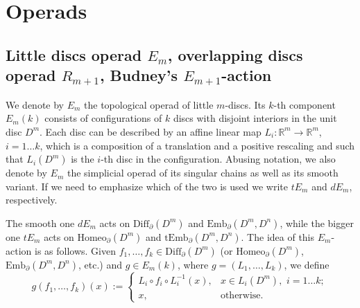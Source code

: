 \documentclass[11pt]{amsart}
\theoremstyle{definition}
\newcommand{\R}{{\mathbb R}}
\newcommand{\Emb}{\mathrm{Emb}}
\newcommand{\tEmb}{\mathrm{tEmb}}
\newcommand{\Diff}{\mathrm{Diff}}
\newcommand{\Homeo}{\mathrm{Homeo}}
\numberwithin{equation}{section}
\begin{document}
\section{Operads}\label{s:operads}

\subsection{Little discs operad $E_m$, overlapping discs operad $R_{m+1}$, Budney's $E_{m+1}$-action}\label{ss:little_discs}
We denote by $E_m$ the topological operad of little $m$-discs. Its $k$-th component $E_m(k)$ consists of configurations of $k$ discs with disjoint interiors
in the unit disc $D^m$. Each disc can be described by an affine linear map $L_i\colon\R^m\to\R^m$, $i=1\ldots k$, which is a composition of a translation and a positive rescaling and such that $L_i(D^m)$ is the $i$-th disc in the configuration. Abusing notation, we also denote by $E_m$ the simplicial operad of its singular chains
as well as its smooth variant. If we need to emphasize which of the two is used we write $tE_m$ and $dE_m$, respectively.

The smooth one $dE_m$ acts on $\Diff_\partial(D^m)$ and $\Emb_\partial(D^m,D^n)$, while the bigger one $tE_m$ acts on $\Homeo_\partial(D^m)$ 
and $\tEmb_\partial(D^m,D^n)$. The idea of this $E_m$-action is as follows. Given $f_1,\ldots,f_k\in\Diff_\partial(D^m)$ (or $\Homeo_\partial(D^m)$,
$\Emb_\partial(D^m,D^n)$, etc.) and $g\in E_m(k)$, where $g=(L_1,\ldots,L_k)$, we define 
\[
g(f_1,\ldots,f_k)(x):=
\begin{cases}
L_i\circ f_i\circ L_i^{-1}(x),& x\in L_i(D^m),\,\, i=1\ldots k;\\
x,& \text{otherwise.}
\end{cases}
\]
\end{document}
